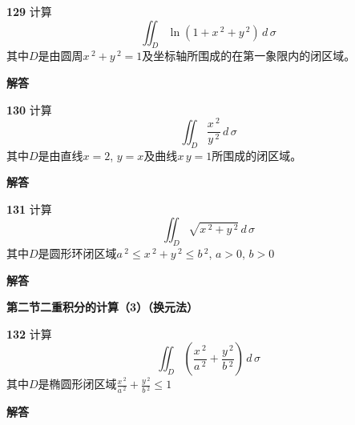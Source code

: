 \documentclass[a4paper,10pt]{article} %
\begin{document}

\textheight


\par\noindent \textbf{129} \quad 计算
$$ \iint_D \ln \left(1+x\,^2+y\,^2\right)\,d\,\sigma$$
其中$D$是由圆周$x\,^2+y\,^2=1$及坐标轴所围成的在第一象限内的闭区域。
\par\noindent \textbf{ 解答}




\textheight


\par\noindent \textbf{130} \quad 计算
$$ \iint_D \frac{x\,^2}{y\,^2}\,d\,\sigma$$
其中$D$是由直线$x=2$, $y=x$及曲线$x\,y=1$所围成的闭区域。
\par\noindent \textbf{ 解答}




\textheight


\par\noindent \textbf{131} \quad 计算
$$ \iint_D \sqrt{x\,^2+y\,^2}\,d\,\sigma$$
其中$D$是圆形环闭区域$a\,^2\leq x\,^2+y\,^2 \leq b\,^2$, $a>0$, $b>0$
\par\noindent \textbf{ 解答}




\textheight

\newpage
\par\noindent \textbf{第二节\quad 二重积分的计算（3）（换元法）} 
\par\noindent \textbf{132} \quad 计算
$$ \iint_D \left(\frac{x\,^2}{a\,^2}+\frac{y\,^2}{b\,^2}\right)\,d\,\sigma$$
其中$D$是椭圆形闭区域$\displaystyle\frac{x\,^2}{a\,^2}+\frac{y\,^2}{b\,^2} \leq 1$
\par\noindent \textbf{ 解答}




\textheight
\end{document}
